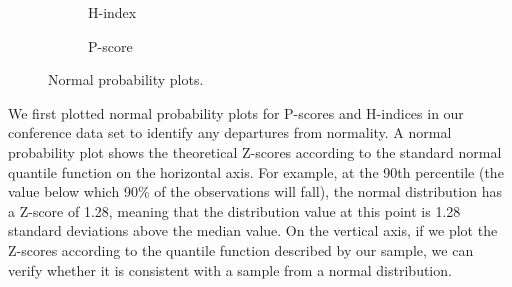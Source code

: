 \documentclass[man]{apa6}
\begin{document}
\begin{figure}[h]
\centering
\begin{subfigure}[b]{0.4\textwidth}
    \centering
    \caption{H-index}
    \label{fig:hindex_normality}
  
\end{subfigure}  
\begin{subfigure}[b]{0.4\textwidth}
    \centering  
    \caption{P-score}
    \label{fig:pscore_normality}

\end{subfigure}  
\caption{Normal probability plots.}
\end{figure}

We first plotted normal probability plots for P-scores and H-indices in our conference data set 
to identify any departures from normality. A normal probability plot shows the theoretical Z-scores
according to the standard normal quantile function on the horizontal axis. For example, at the 90th
percentile (the value below which 90\% of the observations will fall), the normal distribution has a
Z-score of 1.28, meaning that the distribution value at this point is 1.28 standard deviations above the median value. On the vertical axis, if
we plot the Z-scores according to the quantile function described by our sample, we can verify
whether it is consistent with a sample from a normal distribution.
\end{document}
